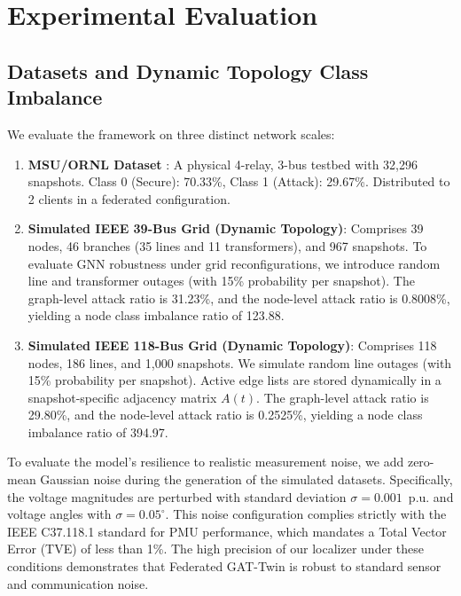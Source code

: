 \documentclass[conference]{IEEEtran}
\begin{document}
\section{Experimental Evaluation}\label{sec:evaluation}

\subsection{Datasets and Dynamic Topology Class Imbalance}
We evaluate the framework on three distinct network scales:
\begin{enumerate}
    \item \textbf{MSU/ORNL Dataset} \cite{msu_ornl_dataset}: A physical 4-relay, 3-bus testbed with 32,296 snapshots. Class 0 (Secure): 70.33\%, Class 1 (Attack): 29.67\%. Distributed to 2 clients in a federated configuration.
    \item \textbf{Simulated IEEE 39-Bus Grid (Dynamic Topology)}: Comprises 39 nodes, 46 branches (35 lines and 11 transformers), and 967 snapshots. To evaluate GNN robustness under grid reconfigurations, we introduce random line and transformer outages (with 15\% probability per snapshot). The graph-level attack ratio is 31.23\%, and the node-level attack ratio is 0.8008\%, yielding a node class imbalance ratio of 123.88.
    \item \textbf{Simulated IEEE 118-Bus Grid (Dynamic Topology)}: Comprises 118 nodes, 186 lines, and 1,000 snapshots. We simulate random line outages (with 15\% probability per snapshot). Active edge lists are stored dynamically in a snapshot-specific adjacency matrix $A(t)$. The graph-level attack ratio is 29.80\%, and the node-level attack ratio is 0.2525\%, yielding a node class imbalance ratio of 394.97.
\end{enumerate}

To evaluate the model's resilience to realistic measurement noise, we add zero-mean Gaussian noise during the generation of the simulated datasets. Specifically, the voltage magnitudes are perturbed with standard deviation $\sigma = 0.001$~p.u. and voltage angles with $\sigma = 0.05^{\circ}$. This noise configuration complies strictly with the IEEE C37.118.1 standard for PMU performance, which mandates a Total Vector Error (TVE) of less than 1\%. The high precision of our localizer under these conditions demonstrates that Federated GAT-Twin is robust to standard sensor and communication noise.
\end{document}

